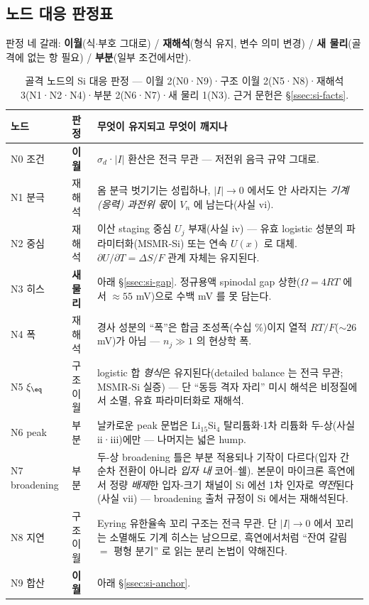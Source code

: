 \subsection{노드 대응 판정표}\label{ssec:si-map}
판정 네 갈래: \textbf{이월}(식$\cdot$부호 그대로) / \textbf{재해석}(형식 유지, 변수 의미
변경) / \textbf{새 물리}(골격에 없는 항 필요) / \textbf{부분}(일부 조건에서만).

\begin{table}[h]
\centering
\small
\begin{tabular}{p{} p{} p{}}
\toprule
노드 & 판정 & 무엇이 유지되고 무엇이 깨지나 \\
\midrule
N0 조건 & \textbf{이월} & $\sigma_d$·$|I|$ 환산은 전극 무관 --- 저전위 음극 규약 그대로. \\
N1 분극 & 재해석 & 옴 분극 벗기기는 성립하나, $|I|\to0$ 에서도 안 사라지는 \emph{기계(응력) 과전위 몫}이 $V_n$ 에 남는다(사실 vi). \\
N2 중심 & 재해석 & 이산 staging 중심 $U_j$ 부재(사실 iv) --- 유효 logistic 성분의 파라미터화(MSMR-Si\cite{verbrugge_lisi2016}) 또는 연속 $U(x)$\cite{chevrier_dahn2009} 로 대체. $\partial U/\partial T=\Delta S/F$ 관계 자체는 유지된다. \\
N3 히스 & \textbf{새 물리} & 아래 \S\ref{ssec:si-gap}. 정규용액 spinodal gap 상한($\Omega{=}4RT$ 에서 $\approx55$ mV)으로 수백 mV 를 못 담는다. \\
N4 폭 & 재해석 & 경사 성분의 ``폭''은 합금 조성폭(수십 \%)이지 열적 $RT/F$($\sim26$ mV)가 아님 --- $n_j\gg1$ 의 현상학 폭. \\
N5 $\xi_\eq$ & 구조 이월 & logistic 합 \emph{형식}은 유지된다(detailed balance 는 전극 무관; MSMR-Si 실증\cite{verbrugge_lisi2016}) --- 단 ``동등 격자 자리'' 미시 해석은 비정질에서 소멸, 유효 파라미터화로 재해석. \\
N6 peak & 부분 & 날카로운 peak 문법은 Li$_{15}$Si$_4$ 탈리튬화$\cdot$1차 리튬화 두-상(사실 ii·iii)에만 --- 나머지는 넓은 hump. \\
N7 broadening & 부분 & 두-상 broadening 틀은 부분 적용되나 기작이 다르다(입자 간 순차 전환이 아니라 \emph{입자 내} 코어--쉘). 본문이 마이크론 흑연에서 정량 \emph{배제}한 입자-크기 채널이 Si 에선 1차 인자로 \emph{역전}된다(사실 vii) --- broadening 출처 규정이 Si 에서는 재해석된다. \\
N8 지연 & 구조 이월 & Eyring 유한율속 꼬리 구조는 전극 무관. 단 $|I|\to0$ 에서 꼬리는 소멸해도 기계 히스는 남으므로, 흑연에서처럼 ``잔여 갈림 $=$ 평형 분기'' 로 읽는 분리 논법이 약해진다. \\
N9 합산 & \textbf{이월} & 아래 \S\ref{ssec:si-anchor}. \\
\bottomrule
\end{tabular}
\caption{골격 노드의 Si 대응 판정 --- 이월 2(N0·N9)·구조 이월 2(N5·N8)·재해석 3(N1·N2·N4)·부분
2(N6·N7)·새 물리 1(N3). 근거 문헌은 \S\ref{ssec:si-facts}.}
\label{tab:simap}
\end{table}

